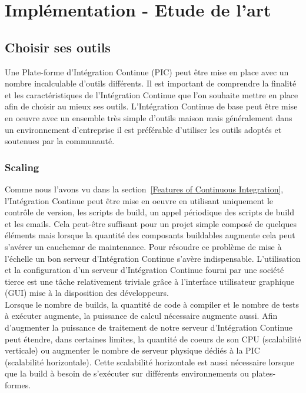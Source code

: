 \chapter{Implémentation - Etude de l'art}

  \section{Choisir ses outils}
  Une Plate-forme d'Intégration Continue (PIC) peut être mise en place avec un nombre incalculable d'outils différents. Il est important de comprendre la finalité et les caractéristiques de l'Intégration Continue que l'on souhaite mettre en place afin de choisir au mieux ses outils. L'Intégration Continue de base peut être mise en oeuvre avec un ensemble très simple d'outils maison mais généralement dans un environnement d'entreprise il est préférable d'utiliser les outils adoptés et soutenues par la communauté.

    \subsection{Scaling}
    Comme nous l'avons vu dans la section~\ref{Features of Continuous Integration}, l'Intégration Continue peut être mise en oeuvre en utilisant uniquement le contrôle de version, les scripts de build, un appel périodique des scripts de build et les emails. Cela peut-être suffisant pour un projet simple composé de quelques éléments mais lorsque la quantité des composants buildables augmente cela peut s'avérer un cauchemar de maintenance. Pour résoudre ce problème de mise à l'échelle un bon serveur d'Intégration Continue s'avère indispensable. L'utilisation et la configuration d'un serveur d'Intégration Continue fourni par une société tierce est une tâche relativement triviale grâce à l'interface utilisateur graphique (GUI) mise à la disposition des développeurs.\\

    Lorsque le nombre de builds, la quantité de code à compiler et le nombre de tests à exécuter augmente, la puissance de calcul nécessaire augmente aussi. Afin d'augmenter la puissance de traitement de notre serveur d'Intégration Continue peut étendre, dans certaines limites, la quantité de coeurs de son CPU (scalabilité verticale) ou augmenter le nombre de serveur physique dédiés à la PIC (scalabilité horizontale). Cette scalabilité horizontale est aussi nécessaire lorsque que la build à besoin de s'exécuter sur différents environnements ou plates-formes.


